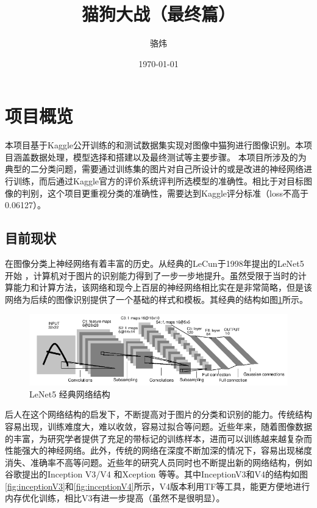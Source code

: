 \documentclass[a4paper,11pt]{article}
\author{骆炜}
\date{\today}
\title{猫狗大战（最终篇）}
\begin{document}
\maketitle
\tableofcontents


\section{项目概览}
\label{sec:org3e7dc3d}
本项目基于Kaggle公开训练的和测试数据集实现对图像中猫狗进行图像识别。本项目涵盖数据处理，模型选择和搭建以及最终测试等主要步骤。
本项目所涉及的为典型的二分类问题，需要通过训练集的图片对自己所设计的或是改进的神经网络进行训练，而后通过Kaggle官方的评价系统评判所选模型的准确性。相比于对目标图像的判别，这个项目更重视分类的准确性，需要达到Kaggle评分标准（loss不高于0.06127）。

\subsection{目前现状}
\label{sec:orgad1c2c2}
在图像分类上神经网络有着丰富的历史。从经典的LeCun于1998年提出的LeNet5开始 \cite{KrizhevskySutskeverHinton2017} ，计算机对于图片的识别能力得到了一步一步地提升。虽然受限于当时的计算能力和计算方法，该网络和现今上百层的神经网络相比实在是非常简略，但是该网络为后续的图像识别提供了一个基础的样式和模板。其经典的结构如图\ref{fig:lenet5}所示。

\begin{figure}[htb]
\centering
\includegraphics[scale=0.4]{./figure/lenet5.png}
\caption{LeNet5 经典网络结构}
\label{fig:lenet5}
\end{figure}

后人在这个网络结构的启发下，不断提高对于图片的分类和识别的能力。传统结构容易出现，训练难度大，难以收敛，容易过拟合等问题。近些年来，随着图像数据的丰富，为研究学者提供了充足的带标记的训练样本，进而可以训练越来越复杂而性能强大的神经网络。此外，传统的网络在深度不断加深的情况下，容易出现梯度消失、准确率不高等问题。近些年的研究人员同时也不断提出新的网络结构，例如谷歌提出的Inception V3/V4 \cite{SzegedyIoffeVanhoucke2016} 和Xception \cite{Chollet_2017} 等等。其中InceptionV3和V4的结构如图\ref{fig:inceptionV3}和\ref{fig:inceptionV4}所示，V4版本利用TF等工具，能更方便地进行内存优化训练，相比V3有进一步提高（虽然不是很明显）。
\end{document}
